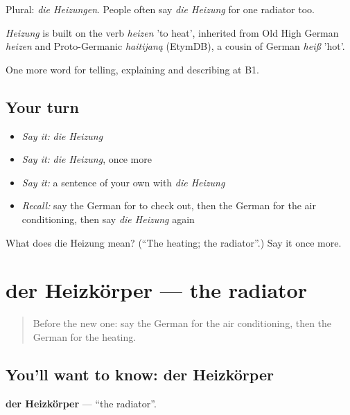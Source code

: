 Plural: \emph{die Heizungen}. People often say \emph{die Heizung} for one radiator too.

\begin{cousinweb}
\emph{Heizung} is built on the verb \emph{heizen} 'to heat', inherited from Old High German \emph{heizen} and Proto-Germanic \emph{haitijaną} (EtymDB), a cousin of German \emph{heiß} 'hot'.
\end{cousinweb}

\begin{grammarlens}[title={What you've built}]
One more word for telling, explaining and describing at B1.
\end{grammarlens}

\subsection*{Your turn}
\begin{itemize}
\raggedright
  \item \emph{Say it:} \emph{die Heizung}
  \item \emph{Say it:} \emph{die Heizung}, once more
  \item \emph{Say it:} a sentence of your own with \emph{die Heizung}
  \item \emph{Recall:} say the German for to check out, then the German for the air conditioning, then say \emph{die Heizung} again
\end{itemize}

\begin{tcolorbox}[breakable,colback=teal!4,colframe=teal!35!black,title={Before you move on}]
What does die Heizung mean? (\textquotedblleft{}The heating; the radiator\textquotedblright{}.) Say it once more.
\end{tcolorbox}
\section[der Heizkörper]{der Heizkörper — the radiator}

\label{lesson:GE-C427-heizkoerper}



\begin{quote}
Before the new one: say the German for the air conditioning, then the German for the heating.
\end{quote}

\subsection*{You'll want to know: der Heizkörper}
\textbf{der Heizkörper} — \textquotedblleft{}the radiator\textquotedblright{}.

